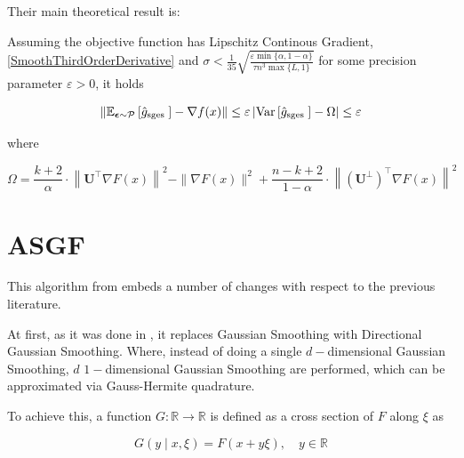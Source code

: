 Their main theoretical result is:

\begin{thm}
	
	Assuming the objective function has Lipschitz Continous Gradient, \ref{SmoothThirdOrderDerivative} and $ \sigma<\frac{1}{35} \sqrt{\frac{\varepsilon \min \{\alpha, 1-\alpha\}}{\tau n^{3} \max \{L, 1\}}} $ for some precision
	parameter $ \varepsilon>0 $, it holds

	\begin{equation}
		\left\|\mathbb{E}_{\boldsymbol{\epsilon} \sim \mathcal{P}}\left[\hat{g}_{\text {sges }}\right]-\nabla f(x)\right\| \leq \varepsilon \\
	\left|\operatorname{Var}\left[\hat{g}_{\text {sges }}\right]-\Omega\right| \leq \varepsilon
	\end{equation}
	
	where
	
	\begin{equation}
		\Omega=\frac{k+2}{\alpha} \cdot\left\|\mathbf{U}^{\top} \nabla F(x)\right\|^{2}-\|\nabla F(x)\|^{2} + \frac{n-k+2}{1-\alpha} \cdot\left\|\left(\mathbf{U}^{\perp}\right)^{\top} \nabla F(x)\right\|^{2}
	\end{equation}

\end{thm}


\section{ASGF}\label{sect:ASGF} 

This algorithm from \cite{Dereventsov2020} embeds a number of changes with respect to the previous literature. 

At first, as it was done in \cite{zhang2020novel}, it replaces Gaussian Smoothing with Directional Gaussian Smoothing. Where, instead of doing a single $d-$dimensional Gaussian Smoothing, $d$ $1-$dimensional Gaussian Smoothing are performed, which can be approximated via Gauss-Hermite quadrature. 

To achieve this, a function $G:\mathbb{R} \rightarrow \mathbb{R}$ is defined as a cross section of $F$ along $\xi$ as

\begin{equation}
	G(y \mid x, \xi)=F(x+y \xi), \quad y \in \mathbb{R} 
\end{equation}

